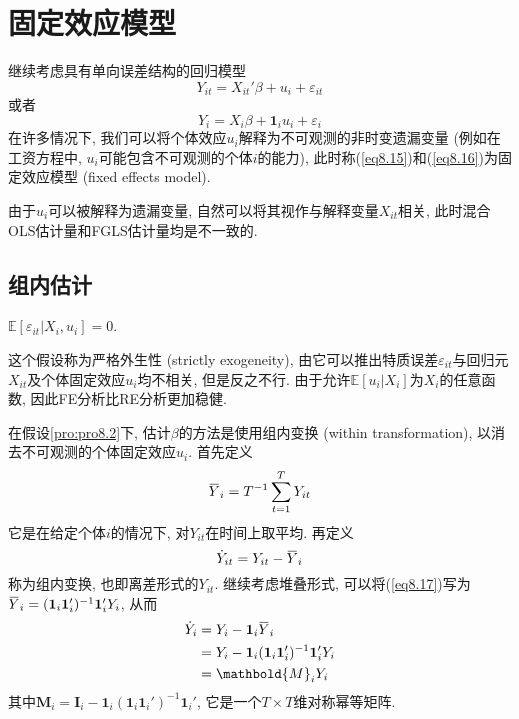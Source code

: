 \documentclass[cn, 12pt, math=mtpro2, bibstyle=apa, blue, twocol]{elegantbook}
\newcommand{\E}{\mathbb{E}}
\newcommand{\overbar}[1]{\mkern 1.5mu\overline{\mkern-1.5mu#1\mkern-1.5mu}\mkern 1.5mu}
\begin{document}
\section{固定效应模型}
继续考虑具有单向误差结构的回归模型
\begin{equation}\label{eq8.15}
  Y_{it}=X_{it}'\beta+u_i+\varepsilon_{it}
\end{equation}
或者
\begin{equation}\label{eq8.16}
  Y_i=X_i\beta+\mathbf{1}_iu_i+\varepsilon_i
\end{equation}
 在许多情况下, 我们可以将个体效应$u_i$解释为不可观测的非时变遗漏变量 (例如在工资方程中, $u_i$可能包含不可观测的个体$i$的能力), 此时称(\ref{eq8.15})和(\ref{eq8.16})为固定效应模型 (fixed effects model).

 由于$u_i$可以被解释为遗漏变量, 自然可以将其视作与解释变量$X_{it}$相关, 此时混合OLS估计量和FGLS估计量均是不一致的.
\subsection{组内估计}
\begin{proposition}\label{pro:pro8.2}
$\E[\varepsilon_{it}|X_i, u_i]=0$.
\end{proposition}
这个假设称为严格外生性 (strictly exogeneity), 由它可以推出特质误差$\varepsilon_{it}$与回归元$X_{it}$及个体固定效应$u_i$均不相关, 但是反之不行.  由于允许$\E[u_i|X_i]$为$X_i$的任意函数, 因此FE分析比RE分析更加稳健.

在假设\ref{pro:pro8.2}下, 估计$\beta$的方法是使用组内变换 (within transformation), 以消去不可观测的个体固定效应$u_i$. 首先定义
\begin{equation}\label{eq8.17}
  \overbar{Y}_i=T^{-1}\sum_{t=1}^{T}Y_{it}
\end{equation}
它是在给定个体$i$的情况下, 对$Y_{it}$在时间上取平均. 再定义
$$\dot{Y}_{it}=Y_{it}-\overbar{Y}_i$$
称为组内变换, 也即离差形式的$Y_{it}$. 继续考虑堆叠形式, 可以将(\ref{eq8.17})写为$\overbar{Y}_i=(\mathbf{1}_i\mathbf{1}_i')^{-1}\mathbf{1}_i'Y_i$, 从而
\begin{align*}
\dot{Y}_i&=Y_i-\mathbf{1}_i\overbar{Y}_i \\
&=Y_i-\mathbf{1}_i(\mathbf{1}_i\mathbf{1}_i')^{-1}\mathbf{1}_i'Y_i \\
&=\mathbold{M}_iY_i
\end{align*}
其中$\mathbold{M}_i=\mathbold{I}_i-\mathbf{1}_i(\mathbf{1}_i\mathbf{1}_i')^{-1}\mathbf{1}_i'$, 它是一个$T\times T$维对称幂等矩阵.
\end{document}

